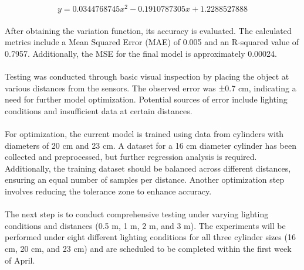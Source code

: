 \begin{equation}
y = 0.0344768745x^2 - 0.1910787305x + 1.2288527888
\end{equation}

\paragraph*{}
After obtaining the variation function, its accuracy is evaluated. The calculated metrics include a Mean Squared Error (MAE) of 0.005 and an R-squared value of 0.7957. Additionally, the MSE for the final model is approximately 0.00024.

\paragraph*{}
Testing was conducted through basic visual inspection by placing the object at various distances from the sensors. The observed error was ±0.7 cm, indicating a need for further model optimization. Potential sources of error include lighting conditions and insufficient data at certain distances.

\paragraph*{}
For optimization, the current model is trained using data from cylinders with diameters of 20 cm and 23 cm. A dataset for a 16 cm diameter cylinder has been collected and preprocessed, but further regression analysis is required. Additionally, the training dataset should be balanced across different distances, ensuring an equal number of samples per distance. Another optimization step involves reducing the tolerance zone to enhance accuracy.

\paragraph*{}
The next step is to conduct comprehensive testing under varying lighting conditions and distances (0.5 m, 1 m, 2 m, and 3 m). The experiments will be performed under eight different lighting conditions for all three cylinder sizes (16 cm, 20 cm, and 23 cm) and are scheduled to be completed within the first week of April.
